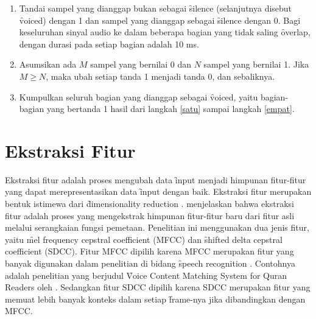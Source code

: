 \begin{enumerate}
	\item Tandai sampel yang dianggap bukan sebagai \f{silence} (selanjutnya disebut \f{voiced}) dengan 1 dan sampel yang dianggap sebagai \f{silence} dengan 0. Bagi keseluruhan sinyal audio ke dalam beberapa bagian yang tidak saling \f{overlap}, dengan durasi pada setiap bagian adalah 10 ms.

	\item \label{empat} Asumsikan ada $M$ sampel yang bernilai 0 dan $N$ sampel yang bernilai 1. Jika $M \geq N$, maka ubah setiap tanda 1 menjadi tanda 0, dan sebaliknya.

	\item Kumpulkan seluruh bagian yang dianggap sebagai \f{voiced}, yaitu bagian-bagian yang bertanda 1 hasil dari langkah \ref{satu} sampai langkah \ref{empat}.
\end{enumerate}


	
\section{Ekstraksi Fitur} \label{chap:ekstraksi fitur}
Ekstraksi fitur adalah proses mengubah data \f{input} menjadi himpunan fitur-fitur yang dapat merepresentasikan data \f{input} dengan baik. Ekstraksi fitur merupakan bentuk istimewa dari \f{dimensionality reduction} \citep{Soft-Computational}. \cite{wyse1980critical} menjelaskan bahwa ekstraksi fitur adalah proses yang mengekstrak himpunan fitur-fitur baru dari fitur asli melalui serangkaian fungsi pemetaan. Penelitian ini menggunakan dua jenis fitur, yaitu \f{mel frequency cepstral coefficient} (MFCC) dan \f{shifted delta cepstral coefficient} (SDCC). Fitur MFCC dipilih karena MFCC merupakan fitur yang banyak digunakan dalam penelitian di bidang \f{speech recognition} \citep{young2002htk}. Contohnya adalah penelitian yang berjudul \f{Voice Content Matching System for Quran Readers} oleh \cite{Muhammad:2010:VCM:1934908.1935467}. Sedangkan fitur SDCC dipilih karena SDCC merupakan fitur yang memuat lebih banyak konteks dalam setiap \f{frame}-nya jika dibandingkan dengan MFCC.


